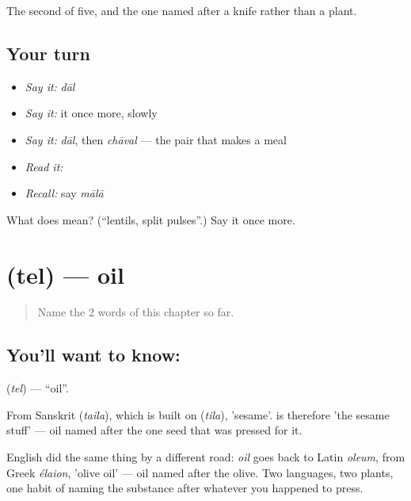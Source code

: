 \begin{grammarlens}[title={What you've built}]
The second of five, and the one named after a knife rather than a plant.
\end{grammarlens}

\subsection*{Your turn}
\begin{itemize}
\raggedright
  \item \emph{Say it:} \emph{dāl}
  \item \emph{Say it:} it once more, slowly
  \item \emph{Say it:} \emph{dāl}, then \emph{chāval} — the pair that makes a meal
  \item \emph{Read it:} \textbf{}
  \item \emph{Recall:} say \emph{mālā}
\end{itemize}

\begin{tcolorbox}[breakable,colback=teal!4,colframe=teal!35!black,title={Before you move on}]
What does  mean? (\textquotedblleft{}lentils, split pulses\textquotedblright{}.) Say it once more.
\end{tcolorbox}
\section[\texorpdfstring{\hi{तेल} (tel)}{तेल (tel)}]{ (tel) — oil}

\label{lesson:HI-C52-oil}



\begin{quote}
Name the 2 words of this chapter so far.
\end{quote}

\subsection*{You'll want to know: }
\textbf{} (\emph{tel}) — \textquotedblleft{}oil\textquotedblright{}.

From Sanskrit  (\emph{taila}), which is built on  (\emph{tila}), 'sesame'.  is therefore 'the sesame stuff' — oil named after the one seed that was pressed for it.

English did the same thing by a different road: \emph{oil} goes back to Latin \emph{oleum}, from Greek \emph{élaion}, 'olive oil' — oil named after the olive. Two languages, two plants, one habit of naming the substance after whatever you happened to press.

